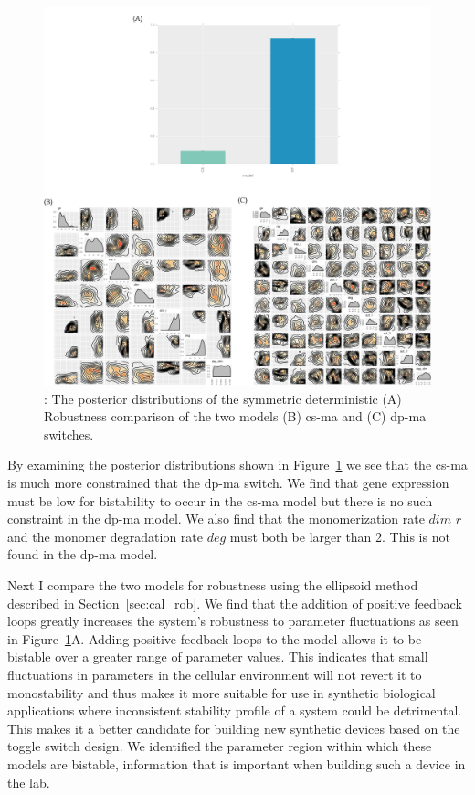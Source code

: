 \begin{figure}[htbp]
\centerfloat
\includegraphics[width=1.1\textwidth]{../../chapters/chapterStabilityFinder/images/MA_sym_post.png}
\caption[Robustness comparison of the \acrshort{cs-ma} and \acrshort{dp-ma} switches]{ \label{fig:ma-sym-det-post}: The posterior distributions of the symmetric deterministic (A) Robustness comparison of the two models (B) \acrshort{cs-ma} and  (C) \acrshort{dp-ma} switches. }
\end{figure}


By examining the posterior distributions shown in Figure~\ref{fig:ma-sym-det-post} we see that the \acrshort{cs-ma} is much more constrained that the \acrshort{dp-ma} switch. We find that gene expression must be low for bistability to occur in the \acrshort{cs-ma} model but there is no such constraint in the \acrshort{dp-ma} model. We also find that the monomerization rate $dim\_r$ and the monomer degradation rate $deg$ must both be larger than 2. This is not found in the \acrshort{dp-ma} model. 

Next I compare the two models for robustness using the ellipsoid method described in Section~\ref{sec:cal_rob}. We find that the addition of positive feedback loops greatly increases the system's robustness to parameter fluctuations as seen in Figure~\ref{fig:ma-sym-det-post}A. Adding positive feedback loops to the model allows it to be bistable over a greater range of parameter values. This indicates that small fluctuations in parameters in the cellular environment will not revert it to monostability and thus makes it more suitable for use in synthetic biological applications where inconsistent stability profile of a system could be detrimental. This makes it a better candidate for building new synthetic devices based on the toggle switch design. We identified the parameter region within which these models are bistable, information that is important when building such a device in the lab.

